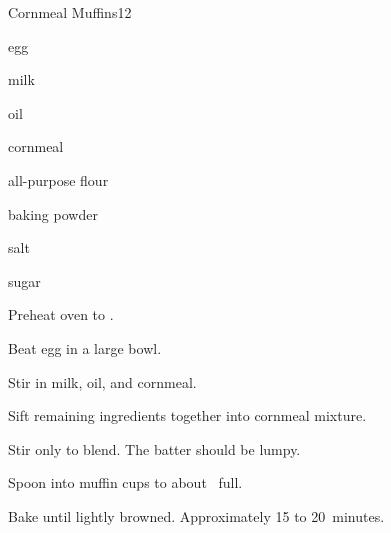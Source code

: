 \begin{recipe}{Cornmeal Muffins}{}{12}

\begin{ingredients}
\item egg
\item {} milk
\item {} oil
\item \C{\threequarter} cornmeal
\item \C{1\half} all-purpose flour
\item {} baking powder
\item \tp{\half} salt
\item {} sugar
\end{ingredients}

\begin{directions}
\item Preheat oven to .
\item Beat egg in a large bowl.
\item Stir in milk, oil, and cornmeal.
\item Sift remaining ingredients together into cornmeal mixture.
\item Stir only to blend. The batter should be lumpy.
\item Spoon into muffin cups to about \twothird~full.
\item Bake until lightly browned. Approximately 15 to 20~minutes.
\end{directions}

\end{recipe}

